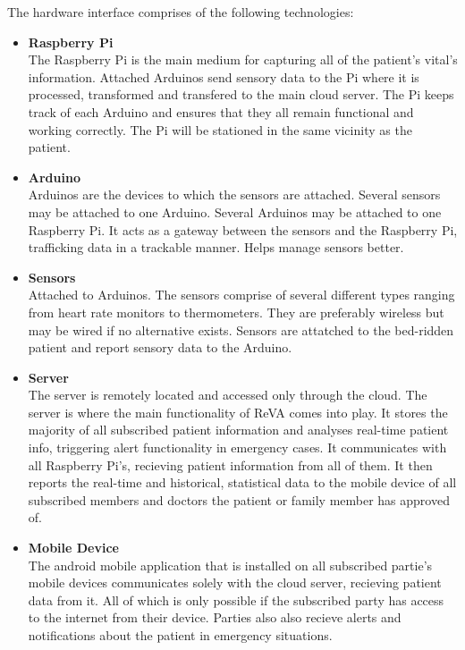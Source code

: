 The hardware interface comprises of the following technologies: 
\begin{itemize}
\item{\textbf{Raspberry Pi}\\The Raspberry Pi is the main medium for capturing all of the patient's vital's information. Attached Arduinos send sensory data
to the Pi where it is processed, transformed and transfered to the main cloud server. The Pi keeps track of each Arduino and ensures that they all remain 
functional and working correctly. The Pi will be stationed in the same vicinity as the patient.}
\item{\textbf{Arduino}\\ Arduinos are the devices to which the sensors are attached. Several sensors may be attached to one Arduino. Several
Arduinos may be attached to one Raspberry Pi. It acts as a gateway between the sensors and the Raspberry Pi, trafficking data in a 
trackable manner. Helps manage sensors better.}
\item{\textbf{Sensors}\\ Attached to Arduinos. The sensors comprise of several different types ranging from heart rate monitors to thermometers. They are 
preferably wireless but may be wired if no alternative exists. Sensors are attatched to the bed-ridden patient and report sensory data to the Arduino.}
\item{\textbf{Server}\\ The server is remotely located and accessed only through the cloud. The server is where the main functionality of ReVA comes into play. 
It stores the majority of all subscribed patient information and analyses real-time patient info, triggering alert functionality in emergency cases. It 
communicates with all Raspberry Pi's, recieving patient information from all of them. It then reports the real-time and historical, statistical data to the mobile device of all 
subscribed members and doctors the patient or family member has approved of.} 
\item{\textbf{Mobile Device}\\ The android mobile application that is installed on all subscribed partie's mobile devices communicates solely with the cloud server,
recieving patient data from it. All of which is only possible if the subscribed party has access to the internet from their device. Parties also 
also recieve alerts and notifications about the patient in emergency situations.}
\end{itemize}
